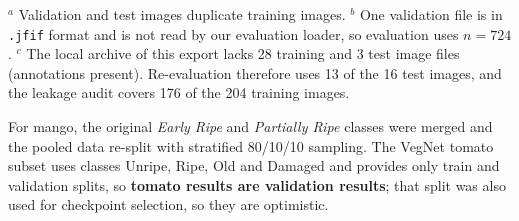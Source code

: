 \documentclass[10pt,twocolumn]{article}
\begin{document}
\begin{table}[t]
\centering\small
\caption{Datasets (train/val/test images as exported). Stage-1 training splits include augmented copies; ``src'' is the number of unique source photographs per dataset.}
\label{tab:data}
\setlength{\tabcolsep}{3pt}
\par\vspace{3pt}
{\footnotesize\raggedright
$^a$ Validation and test images duplicate training images.
$^b$ One validation file is in \texttt{.jfif} format and is not read by our evaluation loader, so evaluation uses $n=724$.
$^c$ The local archive of this export lacks 28 training and 3 test image files (annotations present). Re-evaluation therefore uses 13 of the 16 test images, and the leakage audit covers 176 of the 204 training images.\par}
\end{table}

For mango, the original \emph{Early Ripe} and \emph{Partially Ripe} classes were merged and the pooled data re-split with stratified 80/10/10 sampling. The VegNet tomato subset uses classes Unripe, Ripe, Old and Damaged and provides only train and validation splits, so \textbf{tomato results are validation results}; that split was also used for checkpoint selection, so they are optimistic.
\end{document}
